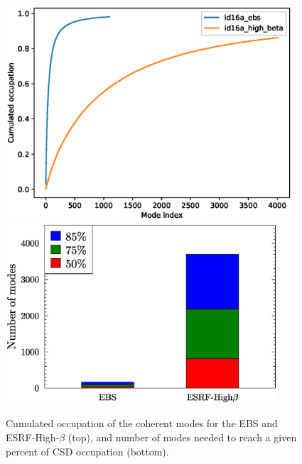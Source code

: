 \documentclass{iucr}              %
\begin{document}
\begin{figure}\label{fig:histomodes}
    \centering
        \includegraphics[width=0.95\textwidth]{GRAPHICS/cumulated_occupation.eps}
        \includegraphics[width=0.9\textwidth]{GRAPHICS/up_to_mode_id16a.eps}
    \caption{Cumulated occupation of the coherent modes for the EBS and ESRF-High-$\beta$ (top), and number of modes needed to reach a given percent of CSD occupation (bottom). }
\end{figure}
\end{document}
